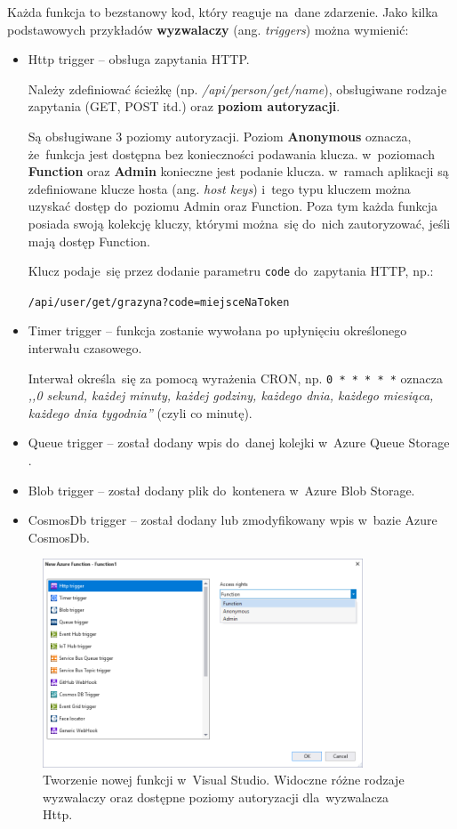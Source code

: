 \documentclass[12pt,a4paper,twoside,titlepage,openright]{book}
\begin{document}
Każda funkcja to bezstanowy kod, który reaguje na~dane zdarzenie. Jako kilka podstawowych przykładów \textbf{wyzwalaczy} (ang. \textit{triggers}) można wymienić:
\begin{itemize}
\item Http trigger -- obsługa zapytania HTTP. 

Należy zdefiniować ścieżkę (np. \textit{/api/person/get/{name}}), obsługiwane rodzaje zapytania (GET, POST itd.) oraz \textbf{poziom autoryzacji}.

Są obsługiwane 3 poziomy autoryzacji. Poziom \textbf{Anonymous} oznacza, że~funkcja jest dostępna bez konieczności podawania klucza. w~poziomach \textbf{Function} oraz \textbf{Admin} konieczne jest podanie klucza. w~ramach aplikacji są zdefiniowane klucze hosta (ang. \textit{host keys}) i~tego typu kluczem można uzyskać dostęp do~poziomu Admin oraz Function. Poza tym każda funkcja posiada swoją kolekcję kluczy, którymi można~się do~nich zautoryzować, jeśli mają dostęp Function.

Klucz podaje~się przez dodanie parametru \texttt{code} do~zapytania HTTP, np.:

\texttt{/api/user/get/grazyna?code=miejsceNaToken}
\item Timer trigger -- funkcja zostanie wywołana po upłynięciu określonego interwału czasowego. 

Interwał określa~się za pomocą wyrażenia CRON, np. \texttt{0~*~*~*~*~*} oznacza \textit{,,0 sekund, każdej minuty, każdej godziny, każdego dnia, każdego miesiąca, każdego dnia tygodnia''} (czyli co minutę). \cite{siteAppTimerTrigger}
\item Queue trigger -- został dodany wpis do~danej kolejki w~Azure Queue Storage .
\item Blob trigger -- został dodany plik do~kontenera w~Azure Blob Storage.
\item CosmosDb trigger -- został dodany lub zmodyfikowany wpis w~bazie Azure CosmosDb.
\end{itemize}


\begin{figure}[h]
	\centering
			\includegraphics[width=0.85\textwidth]{new-function.png}
		\caption{Tworzenie nowej funkcji w~Visual Studio. Widoczne różne rodzaje wyzwalaczy oraz dostępne poziomy autoryzacji dla~wyzwalacza Http.}
		\label{fig:new-function}
\end{figure}
\end{document}
